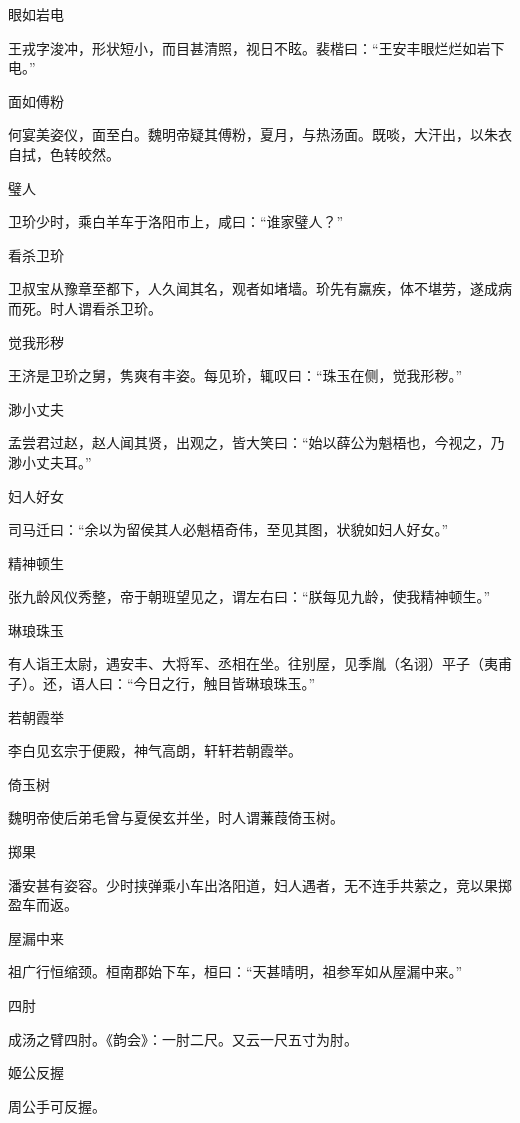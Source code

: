\documentclass[a4paper,12pt,UTF8,twoside]{ctexbook}
\begin{document}
    眼如岩电
    
    王戎字浚冲，形状短小，而目甚清照，视日不眩。裴楷曰：“王安丰眼烂烂如岩下电。”
    
    面如傅粉
    
    何宴美姿仪，面至白。魏明帝疑其傅粉，夏月，与热汤面。既啖，大汗出，以朱衣自拭，色转皎然。
    
    璧人
    
    卫玠少时，乘白羊车于洛阳市上，咸曰：“谁家璧人？”
    
    看杀卫玠
    
    卫叔宝从豫章至都下，人久闻其名，观者如堵墙。玠先有羸疾，体不堪劳，遂成病而死。时人谓看杀卫玠。
    
    觉我形秽
    
    王济是卫玠之舅，隽爽有丰姿。每见玠，辄叹曰：“珠玉在侧，觉我形秽。”
    
    渺小丈夫
    
    孟尝君过赵，赵人闻其贤，出观之，皆大笑曰：“始以薛公为魁梧也，今视之，乃渺小丈夫耳。”
    
    妇人好女
    
    司马迁曰：“余以为留侯其人必魁梧奇伟，至见其图，状貌如妇人好女。”
    
    精神顿生
    
    张九龄风仪秀整，帝于朝班望见之，谓左右曰：“朕每见九龄，使我精神顿生。”
    
    琳琅珠玉
    
    有人诣王太尉，遇安丰、大将军、丞相在坐。往别屋，见季胤（名诩）平子（夷甫子）。还，语人曰：“今日之行，触目皆琳琅珠玉。”
    
    若朝霞举
    
    李白见玄宗于便殿，神气高朗，轩轩若朝霞举。
    
    倚玉树
    
    魏明帝使后弟毛曾与夏侯玄并坐，时人谓蒹葭倚玉树。
    
    掷果
    
    潘安甚有姿容。少时挟弹乘小车出洛阳道，妇人遇者，无不连手共萦之，竞以果掷盈车而返。
    
    屋漏中来
    
    祖广行恒缩颈。桓南郡始下车，桓曰：“天甚晴明，祖参军如从屋漏中来。”
    
    四肘
    
    成汤之臂四肘。《韵会》：一肘二尺。又云一尺五寸为肘。
    
    姬公反握
    
    周公手可反握。
    
\end{document}

